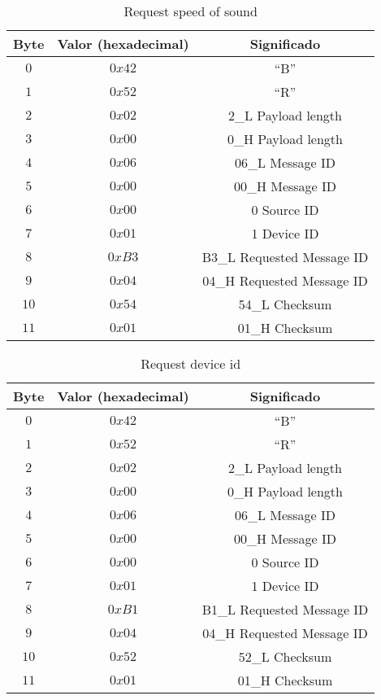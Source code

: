 \begin{table}[h]
	\centering
	\caption{Request speed of sound}
	\begin{tabular}{|c|c|c|}
		\hline
		\textbf{Byte}	&\textbf{Valor (hexadecimal)} &\textbf{Significado} \\ \hline  \hline
		$0$		&$0x42$		& ``B'' \\ \hline
		$1$		&$0x52$		& ``R'' \\ \hline
		$2$		&$0x02$		& 2\_L Payload length \\ \hline
		$3$		&$0x00$		& 0\_H Payload length \\ \hline
		$4$		&$0x06$		& 06\_L Message ID \\ \hline
		$5$		&$0x00$		& 00\_H Message ID \\ \hline
		$6$		&$0x00$		& 0    Source ID \\ \hline 
		$7$		&$0x01$		& 1    Device ID \\ \hline
		$8$		&$0xB3$		& B3\_L Requested Message ID \\ \hline
		$9$		&$0x04$		& 04\_H Requested Message ID\\ \hline  
		$10$	&$0x54$		& 54\_L Checksum\\ \hline   
		$11$	&$0x01$		& 01\_H Checksum\\ \hline  
	\end{tabular}
	\label{tab:6}
\end{table}

\begin{table}[h]
	\centering
	\caption{Request device id}
	\begin{tabular}{|c|c|c|}
		\hline
		\textbf{Byte}	&\textbf{Valor (hexadecimal)} &\textbf{Significado} \\ \hline  \hline
		$0$		&$0x42$		& ``B'' \\ \hline
		$1$		&$0x52$		& ``R'' \\ \hline
		$2$		&$0x02$		& 2\_L Payload length \\ \hline
		$3$		&$0x00$		& 0\_H Payload length \\ \hline
		$4$		&$0x06$		& 06\_L Message ID \\ \hline
		$5$		&$0x00$		& 00\_H Message ID \\ \hline
		$6$		&$0x00$		& 0    Source ID \\ \hline 
		$7$		&$0x01$		& 1    Device ID \\ \hline
		$8$		&$0xB1$		& B1\_L Requested Message ID \\ \hline
		$9$		&$0x04$		& 04\_H Requested Message ID\\ \hline  
		$10$	&$0x52$		& 52\_L Checksum\\ \hline   
		$11$	&$0x01$		& 01\_H Checksum\\ \hline  
	\end{tabular}
	\label{tab:7}
\end{table}

